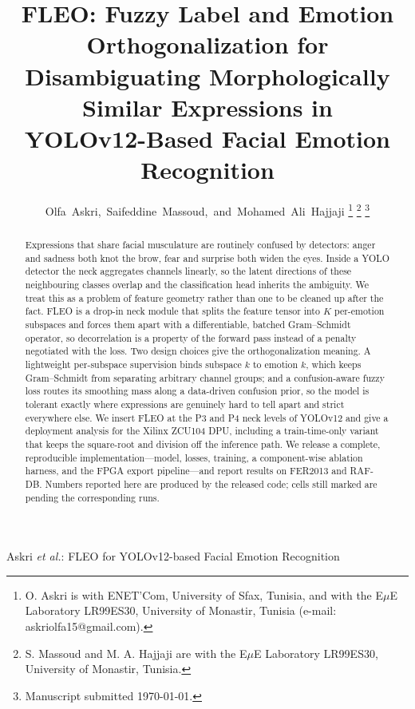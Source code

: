 \documentclass[journal]{IEEEtran}
\begin{document}
\title{FLEO: Fuzzy Label and Emotion Orthogonalization for\\
Disambiguating Morphologically Similar Expressions in\\
YOLOv12-Based Facial Emotion Recognition}

\author{Olfa~Askri,~Saifeddine~Massoud,~and~Mohamed~Ali~Hajjaji%
\thanks{O. Askri is with ENET'Com, University of Sfax, Tunisia, and with the
E$\mu$E Laboratory LR99ES30, University of Monastir, Tunisia
(e-mail: askriolfa15@gmail.com).}%
\thanks{S. Massoud and M. A. Hajjaji are with the E$\mu$E Laboratory LR99ES30,
University of Monastir, Tunisia.}%
\thanks{Manuscript submitted \today.}}

%
{Askri \MakeLowercase{\textit{et al.}}: FLEO for YOLOv12-based Facial Emotion Recognition}

\maketitle

\begin{abstract}
Expressions that share facial musculature are routinely confused by
detectors: anger and sadness both knot the brow, fear and surprise both widen
the eyes. Inside a YOLO detector the neck aggregates channels linearly, so the
latent directions of these neighbouring classes overlap and the classification
head inherits the ambiguity. We treat this as a problem of feature geometry
rather than one to be cleaned up after the fact. FLEO is a drop-in neck module
that splits the feature tensor into $K$ per-emotion subspaces and forces them
apart with a differentiable, batched Gram--Schmidt operator, so decorrelation
is a property of the forward pass instead of a penalty negotiated with the
loss. Two design choices give the orthogonalization meaning. A lightweight
per-subspace supervision binds subspace $k$ to emotion $k$, which keeps
Gram--Schmidt from separating arbitrary channel groups; and a confusion-aware
fuzzy loss routes its smoothing mass along a data-driven confusion prior, so
the model is tolerant exactly where expressions are genuinely hard to tell
apart and strict everywhere else. We insert FLEO at the P3 and P4 neck levels
of YOLOv12 and give a deployment analysis for the Xilinx ZCU104 DPU, including
a train-time-only variant that keeps the square-root and division off the
inference path. We release a complete, reproducible implementation---model,
losses, training, a component-wise ablation harness, and the FPGA export
pipeline---and report results on FER2013 and RAF-DB. Numbers reported here are
produced by the released code; cells still marked are pending the
corresponding runs.
\end{abstract}
\end{document}
